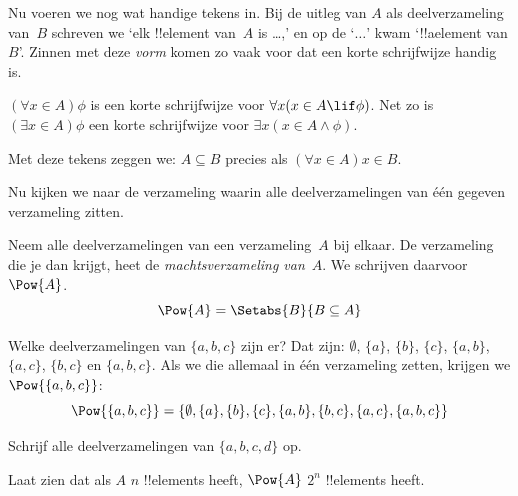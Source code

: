 \documentclass[../../../include/open-logic-section]{subfiles}
\begin{document}
Nu voeren we nog wat handige tekens in. Bij de uitleg van
$A$ als deelverzameling van~$B$ schreven we ‘elk !!{element} van~$A$
is \dots,’ en op de ‘$\dots$’ kwam ‘!!a{element} van $B$’. Zinnen met
deze \emph{vorm} komen zo vaak voor dat een korte schrijfwijze handig
is.

\begin{defn}
$(\forall x \in A)\phi$ is een korte schrijfwijze voor $\forall x(x
\in A \lif \phi)$. Net zo is $(\exists x \in A)\phi$ een korte
schrijfwijze voor $\exists x(x \in A \land \phi)$.
\end{defn}

Met deze tekens zeggen we: $A \subseteq B$ precies als
$(\forall x \in A)x \in B$.

Nu kijken we naar de verzameling waarin alle deelverzamelingen van één
gegeven verzameling zitten.

\begin{defn}[Machtsverzameling]
Neem alle deelverzamelingen van een verzameling~$A$ bij elkaar. De
verzameling die je dan krijgt, heet de \emph{machtsverzameling van}~$A$.
We schrijven daarvoor $\Pow{A}$.
  \[
    \Pow{A} = \Setabs{B}{B \subseteq A} 
  \]
\end{defn}

\begin{ex}
Welke deelverzamelingen van $\{ a, b, c \}$ zijn er? Dat zijn:
$\emptyset$, $\{a \}$, $\{b\}$, $\{c\}$, $\{a, b\}$, $\{a, c\}$,
$\{b, c\}$ en $\{a, b, c\}$. Als we die allemaal in één verzameling
zetten, krijgen we $\Pow{\{a,b,c\}}$:
\[
\Pow{\{ a, b, c \}} = \{\emptyset, \{a \}, \{b\}, \{c\}, \{a, b\},
\{b, c\}, \{a, c\}, \{a, b, c\}\}
\]
\end{ex}

\begin{prob}
Schrijf alle deelverzamelingen van $\{a, b, c, d\}$ op.
\end{prob}

\begin{prob}
Laat zien dat als $A$ $n$ !!{element}s heeft, $\Pow{A}$ $2^n$
!!{element}s heeft.
\end{prob}
\end{document}
